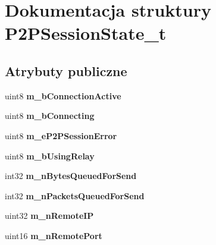 \hypertarget{struct_p2_p_session_state__t}{}\section{Dokumentacja struktury P2\+P\+Session\+State\+\_\+t}
\label{struct_p2_p_session_state__t}
\subsection*{Atrybuty publiczne}
\begin{DoxyCompactItemize}
\item 
\mbox{\label{struct_p2_p_session_state__t_a13d30aa6ad8ed4de7316242ea792eeed}} 
uint8 {\bfseries m\+\_\+b\+Connection\+Active}
\item 
\mbox{\label{struct_p2_p_session_state__t_affe29b1777fff94aa1cf028741a2291c}} 
uint8 {\bfseries m\+\_\+b\+Connecting}
\item 
\mbox{\label{struct_p2_p_session_state__t_a8c7ec149d8803d7f5a84c4b93ff0ba6b}} 
uint8 {\bfseries m\+\_\+e\+P2\+P\+Session\+Error}
\item 
\mbox{\label{struct_p2_p_session_state__t_a6aa759dbf5d5b96615ee0b077c5709ae}} 
uint8 {\bfseries m\+\_\+b\+Using\+Relay}
\item 
\mbox{\label{struct_p2_p_session_state__t_a62eef33b75a38846e86478dc67e3d03b}} 
int32 {\bfseries m\+\_\+n\+Bytes\+Queued\+For\+Send}
\item 
\mbox{\label{struct_p2_p_session_state__t_a63c1f6689b04fdf1f3e6679ef1d6c64f}} 
int32 {\bfseries m\+\_\+n\+Packets\+Queued\+For\+Send}
\item 
\mbox{\label{struct_p2_p_session_state__t_a69ac05c4479bdac20ad8dad84170dd46}} 
uint32 {\bfseries m\+\_\+n\+Remote\+IP}
\item 
\mbox{\label{struct_p2_p_session_state__t_a2130179acb60d3e9a8753a278ebff627}} 
uint16 {\bfseries m\+\_\+n\+Remote\+Port}
\end{DoxyCompactItemize}


